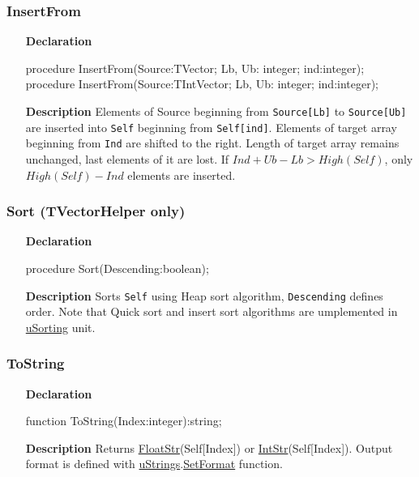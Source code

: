 \documentclass[12pt,a4paper,oneside]{report}
\newcommand{\declarationitem}[1]{\textbf{#1}}
\newcommand{\descriptiontitle}[1]{\textbf{#1}}
\newcommand{\code}[1]{\texttt{#1}}
\begin{document}
\subsubsection{InsertFrom}
\begin{itemize}
	\item[\declarationitem{Declaration}\hfill]
	\begin{flushleft}
     procedure InsertFrom(Source:TVector; Lb, Ub: integer; ind:integer);\\ \vspace{4pt}
     procedure InsertFrom(Source:TIntVector; Lb, Ub: integer; ind:integer);
	\end{flushleft}
	\item[\descriptiontitle{Description}\hfill]
Elements of Source beginning from \code{Source[Lb]} to \code{Source[Ub]} are inserted into \code{Self} beginning from \code{Self[ind]}. Elements of target array beginning from \code{Ind} are shifted to the right. Length of target array remains unchanged, last elements of it are lost. If $Ind + Ub - Lb > High(Self)$, only $High(Self) - Ind$ elements are inserted. 	
\end{itemize}
\subsubsection{Sort (TVectorHelper only)}
\begin{itemize}
	\item[\declarationitem{Declaration}\hfill]
	\begin{flushleft}
     procedure Sort(Descending:boolean);
	\end{flushleft}
	\item[\descriptiontitle{Description}\hfill]
	Sorts \code{Self} using Heap sort algorithm, \code{Descending} defines order. Note that Quick sort and insert sort algorithms are umplemented in \hyperref[usorting]{uSorting} unit.
\end{itemize}
\subsubsection{ToString}
\begin{itemize}
	\item[\declarationitem{Declaration}\hfill]
	\begin{flushleft}
     function ToString(Index:integer):string;
	\end{flushleft}
	\item[\descriptiontitle{Description}\hfill]
	Returns \hyperref[ustrings-FloatStr]{FloatStr}(Self[Index]) or \hyperref[ustrings-IntStr]{IntStr}(Self[Index]). Output format is defined with \hyperref[ustrings]{uStrings}.\hyperref[ustrings-SetFormat]{SetFormat} function.
\end{itemize}
\end{document}
